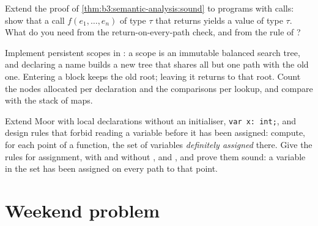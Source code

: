 \begin{exercise}[$\star\star\star$]\label{exo:b3:semantic-analysis:10}
Extend the proof of \cref{thm:b3:semantic-analysis:sound} to programs with calls: show that a call $f(e_1, \dots, e_n)$ of type $\tau$ that returns yields a value of type $\tau$. What do you need from the return-on-every-path check, and from the rule of ?
\end{exercise}

\begin{exercise}[$\star\star\star$]\label{exo:b3:semantic-analysis:11}
Implement persistent scopes in : a scope is an immutable balanced search tree, and declaring a name builds a new tree that shares all but one path with the old one. Entering a block keeps the old root; leaving it returns to that root. Count the nodes allocated per declaration and the comparisons per lookup, and compare with the stack of maps.
\end{exercise}

\begin{exercise}[$\star\star\star$]\label{exo:b3:semantic-analysis:12}
Extend Moor with local declarations without an initialiser, \texttt{var x:\ int;}, and design rules that forbid reading a variable before it has been assigned: compute, for each point of a function, the set of variables \emph{definitely assigned} there. Give the rules for assignment,  with and without ,  and , and prove them sound: a variable in the set has been assigned on every path to that point.
\end{exercise}

\section{Weekend problem}\label{sec:b3:semantic-analysis:problem}

